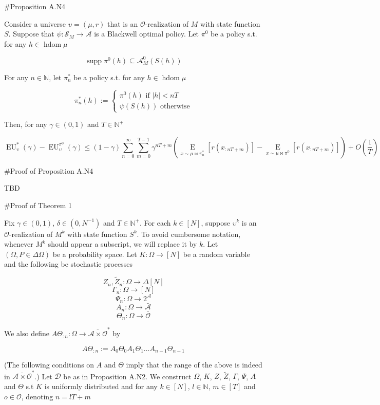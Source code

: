 \documentclass[a4paper]{article}
\newcommand{\Comment}[1]{}
\DeclareMathOperator{\Supp}{supp}
\newcommand{\E}[1]{\underset{#1}{\operatorname{E}}}
\newcommand{\Nats}{\mathbb{N}}
\newcommand{\Abs}[1]{\lvert #1 \rvert}
\newcommand{\Ob}{\mathcal{O}}
\newcommand{\A}{\mathcal{A}}
\newcommand{\St}{\mathcal{S}}
\newcommand{\Ado}{\bar{\Ob}}
\newcommand{\Ada}{\bar{\A}}
\newcommand{\Adao}{\overline{\A \times \Ob}}
\newcommand{\Adfh}{\Adao^*}
\DeclareMathOperator{\HD}{hdom}
\newcommand{\EU}{\operatorname{EU}}
\newcommand{\D}{\mathcal{D}}
\newcommand{\F}{\mathcal{F}}
\newcommand{\Z}{Z}
\begin{document}
\#Proposition A.N4

Consider a universe $\upsilon=(\mu,r)$ that is an $\Ob$-realization of $M$ with state function $S$. Suppose that $\psi: \St_M \rightarrow \A$ is a Blackwell optimal policy. Let $\pi^0$ be a policy s.t. for any $h \in \HD{\mu}$

$$\Supp \pi^0(h) \subseteq \A_M^0\left(S(h)\right)$$

For any $n \in \Nats$, let $\pi^*_n$ be a policy s.t. for any $h \in \HD{\mu}$

$$\pi^*_n(h):=\begin{cases} \pi^0(h) \text{ if } \Abs{h} < nT \\ \psi\left(S(h)\right) \text{ otherwise} \end{cases}$$

Then, for any $\gamma\in(0,1)$ and $T \in \Nats^+$

$$\EU^*_\upsilon(\gamma)-\EU^{\pi^0}_\upsilon(\gamma) \leq (1-\gamma)\sum_{n=0}^\infty \sum_{m=0}^{T-1} \gamma^{nT+m}\left(\E{x\sim\mu\bowtie\pi^*_n}\left[r\left(x_{:nT+m}\right)\right]-\E{x\sim\mu\bowtie\pi^0}\left[r\left(x_{:nT+m}\right)\right]\right) + O\left(\frac{1}{T}\right)$$

\#Proof of Proposition A.N4

TBD

\#Proof of Theorem 1

Fix $\gamma \in (0,1)$, $\delta\in\left(0,N^{-1}\right)$ and $T \in \Nats^+$. For each $k \in [N]$, suppose $\upsilon^k$ is an $\Ob$-realization of $M^k$ with state function $S^k$. To avoid cumbersome notation, whenever $M^k$ should appear a subscript, we will replace it by $k$. Let $(\Omega,P \in \Delta\Omega)$ be a probability space\Comment{ and $\{\F_n \subseteq 2^\Omega\}_{n \in \Nats \sqcup \{-1\}}$ a filtration of $\Omega$}. Let $K: \Omega \rightarrow [N]$ be \Comment{measurable w.r.t. $\F_{-1}$}a random variable and the following be stochastic processes\Comment{ adapted to $\F$}

$$\Z_n,\tilde{\Z}_n: \Omega \rightarrow \Delta[N]$$
%
$$\Gamma_n: \Omega \rightarrow [N]$$
%
$$\Psi_n: \Omega \rightarrow 2^\A$$
%
$$A_n: \Omega \rightarrow \Ada$$
%
$$\Theta_n: \Omega \rightarrow \Ado$$

We also define $A\Theta_{:n}: \Omega \rightarrow \Adfh$ by

$$A\Theta_{:n}:= A_0\Theta_0A_1\Theta_1 \ldots A_{n-1}\Theta_{n-1}$$

(The following conditions on $A$ and $\Theta$ imply that the range of the above is indeed in $\Adfh$.) Let $\D$ be as in Proposition A.N2. We construct $\Omega$\Comment{, $\F$}, $K$, $\Z$, $\tilde{\Z}$, $\Gamma$, $\Psi$, $A$ and $\Theta$ s.t $K$ is uniformly distributed and for any $k \in [N]$, $l \in \Nats$, $m \in [T]$ and $o \in \Ob$, denoting $n = lT+m$
\end{document}
